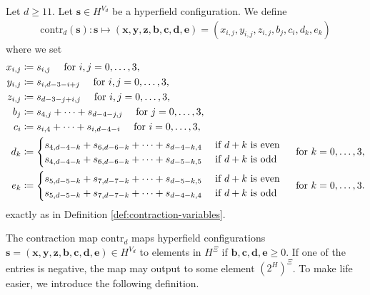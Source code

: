 \begin{definition}
    Let \( d \geq 11 \). Let \( \mathbf{s} \in H^{V_d} \) be a hyperfield configuration. We define 
    \begin{align*}
        \mathrm{contr}_d(\mathbf{s}): \mathbf{s} \mapsto (\mathbf{x}, \mathbf{y}, \mathbf{z}, \mathbf{b}, \mathbf{c}, \mathbf{d}, \mathbf{e}) = (x_{i,j}, y_{i,j}, z_{i,j}, b_j, c_i, d_k, e_k)
    \end{align*}
    where we set
    \begin{align*}
        x_{i,j} &\coloneqq s_{i,j} \quad \text{ for } i,j = 0, \dots, 3, \\
        y_{i,j} &\coloneqq s_{i, d-3-i+j} \quad \text{ for } i,j = 0, \dots, 3, \\
        z_{i,j} &\coloneqq s_{d-3-j+i,j} \quad \text{ for } i,j = 0, \dots, 3, \\
        b_j &\coloneqq s_{4,j} + \dots + s_{d-4-j,j} \quad \text{ for } j = 0, \dots, 3, \\
        c_i &\coloneqq s_{i,4} + \dots + s_{i,d-4-i} \quad \text{ for } i = 0, \dots, 3, \\
        d_k &\coloneqq \begin{cases}
            s_{4,d-4-k} + s_{6,d-6-k} + \dots + s_{d-4-k,4} & \text{ if \( d + k \) is even} \\
            s_{4,d-4-k} + s_{6,d-6-k} + \dots + s_{d-5-k,5} & \text{ if \( d + k \) is odd}
        \end{cases} \quad \text{ for } k = 0, \dots, 3, \\
        e_k &\coloneqq \begin{cases}
            s_{5,d-5-k} + s_{7,d-7-k} + \dots + s_{d-5-k,5} & \text{ if \( d + k \) is even} \\
            s_{5,d-5-k} + s_{7,d-7-k} + \dots + s_{d-4-k,4} & \text{ if \( d + k \) is odd}
        \end{cases} \quad \text{ for } k = 0, \dots, 3.
    \end{align*}
    exactly as in Definition \ref{def:contraction-variables}.
\end{definition}

The contraction map \( \mathrm{contr}_d \) maps hyperfield configurations \( \mathbf{s} = (\mathbf{x}, \mathbf{y}, \mathbf{z}, \mathbf{b}, \mathbf{c}, \mathbf{d}, \mathbf{e}) \in H^{{V_d}} \) to elements in \( H^{\Xi} \) if \( \mathbf{b}, \mathbf{c}, \mathbf{d}, \mathbf{e}  \geq 0\). If one of the entries is negative, the map may output to some element \( (2^H)^{\Xi} \). To make life easier, we introduce the following definition.


